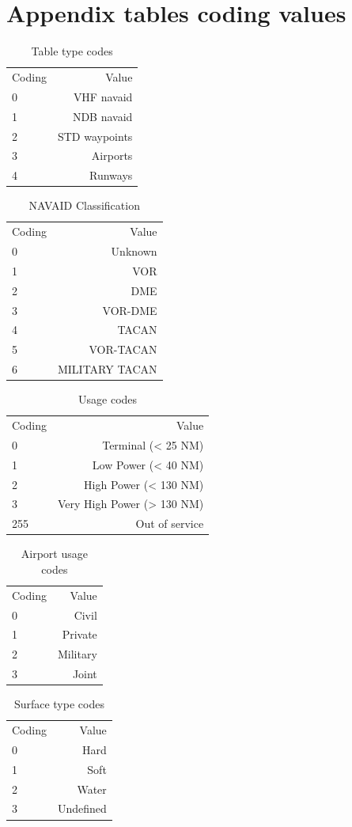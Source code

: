 \documentclass{article}
\begin{document}
\section{Appendix tables coding values}
\begin{table}[H]
  \caption{Table type codes}
  \begin{tabular}{l|r}
  Coding & Value\\
  0 & VHF navaid\\
  1 & NDB navaid\\
  2 & STD waypoints\\
  3 & Airports\\
  4 & Runways\\
\end{tabular}
\end{table}
\begin{table}[H]
  \caption{NAVAID Classification}
  \begin{tabular}{|l|r|}
    Coding & Value\\
    0 & Unknown\\
    1 & VOR\\
    2 & DME\\
    3 & VOR-DME\\
    4 & TACAN\\
    5 & VOR-TACAN\\
    6 & MILITARY TACAN\\
  \end{tabular}
\end{table}
\begin{table}[H]
  \caption{Usage codes}\label{tab:Use_code}
\begin{tabular}{|l|r|}
  Coding & Value\\
  0 & Terminal (< 25 NM)\\
  1 & Low Power (< 40 NM)\\
  2 & High Power (< 130 NM)\\
  3 & Very High Power (> 130 NM)\\
  255 & Out of service\\
\end{tabular}
\end{table}
\begin{table}[H]
  \caption{Airport usage codes}
  \begin{tabular}{l|r}
  Coding & Value\\
  0 & Civil\\
  1 & Private\\
  2 & Military\\
  3 & Joint\\
\end{tabular}
\end{table}
\begin{table}[H]
  \caption{Surface type codes}
  \begin{tabular}{l|r}
  Coding & Value\\
  0 & Hard\\
  1 & Soft\\
  2 & Water\\
  3 & Undefined\\
\end{tabular}
\end{table}
\end{document}
